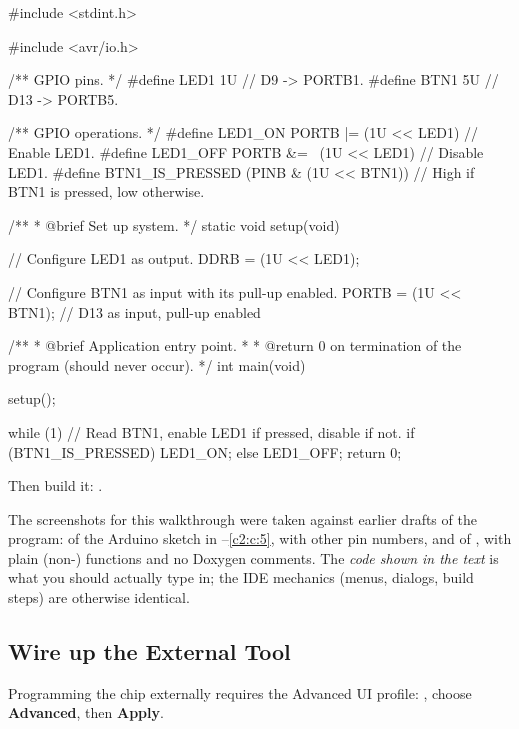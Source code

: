 \begin{ccode}
#include <stdint.h>

#include <avr/io.h>

/** GPIO pins. */
#define LED1 1U // D9  -> PORTB1.
#define BTN1 5U // D13 -> PORTB5.

/** GPIO operations. */
#define LED1_ON PORTB |= (1U << LED1)         // Enable LED1.
#define LED1_OFF PORTB &= ~(1U << LED1)       // Disable LED1.
#define BTN1_IS_PRESSED (PINB & (1U << BTN1)) // High if BTN1 is pressed, low otherwise.

/**
 * @brief Set up system.
 */
static void setup(void)
{
    // Configure LED1 as output.
    DDRB = (1U << LED1);

    // Configure BTN1 as input with its pull-up enabled.
    PORTB = (1U << BTN1); // D13 as input, pull-up enabled
}

/**
 * @brief Application entry point.
 *
 * @return 0 on termination of the program (should never occur).
 */
int main(void)
{
    setup();

    while (1)
    {
        // Read BTN1, enable LED1 if pressed, disable if not.
        if (BTN1_IS_PRESSED) { LED1_ON; }
        else { LED1_OFF; }
    }
    return 0;
}
\end{ccode}

\noindent Then build it: .


\noindent The screenshots for this walkthrough were taken against earlier drafts of the program:
of the Arduino sketch in --\ref{c2:c:5}, with other pin numbers, and of
, with plain (non-) functions and no Doxygen comments. The \emph{code
shown in the text} is what you should actually type in; the IDE mechanics (menus, dialogs, build steps) are otherwise
identical.

\subsection{Wire up the External Tool}
\label{c2:c:8}
Programming the chip externally requires the Advanced UI profile: ,
choose \textbf{Advanced}, then \textbf{Apply}.



